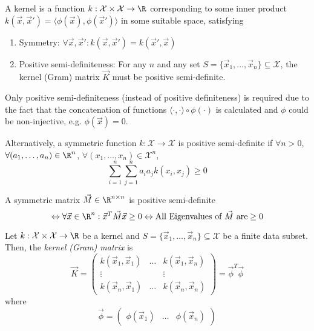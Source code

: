 A kernel is a function
$k : \mathcal{X} \times \mathcal{X} \to \R$
corresponding to some inner product
$k(\vec{x}, \vec{x}') = \langle \phi(\vec{x}), \phi(\vec{x}') \rangle$
in some suitable space,
satisfying
\begin{enumerate}
	\item Symmetry:
	$\forall \vec{x}, \vec{x}': k(\vec{x}, \vec{x}') = k(\vec{x}', \vec{x})$
	\item Positive semi-definiteness:
	For any $n$ and any set $S = \{\vec{x}_1, \dotsc, \vec{x}_n\} \subseteq \mathcal{X}$,
	the kernel (Gram) matrix $\vec{K}$ must be positive
	semi-definite.
\end{enumerate}

Only positive semi-definiteness (instead of positive definiteness)
is required due to the fact that the concatenation of
functions $\langle \cdot, \cdot \rangle \circ \phi(\cdot)$
is calculated and $\phi$ could be non-injective,
e.g. $\phi(\vec{x}) = 0$.

Alternatively, a symmetric function $k : \mathcal{X} \to \mathcal{X}$
is positive semi-definite if
$\forall n > 0$,
$\forall (a_1, \dotsc, a_n) \in \R^n$,
$\forall (x_1, \dotsc, x_n) \in \mathcal{X}^n$,
\begin{equation*}
\sum_{i=1}^n{
	\sum_{j=1}^n{
		a_i a_j k(x_i, x_j)
	}
}
\geq 0
\end{equation*}

A symmetric matrix $\vec{M} \in \R^{n \times n}$
is positive semi-definite
\begin{equation*}
\Leftrightarrow \forall \vec{x} \in \R^n:
\vec{x}^T \vec{M} \vec{x} \geq 0
\Leftrightarrow
\text{All Eigenvalues of $\vec{M}$ are} \geq 0
\end{equation*}

Let $k : \mathcal{X} \times \mathcal{X} \to \R$
be a kernel and $S = \{\vec{x}_1, \dotsc, \vec{x}_n\} \subseteq \mathcal{X}$
be a finite data subset.
Then, the \emph{kernel (Gram) matrix} is
\begin{equation*}
\vec{K} =
\begin{pmatrix}
k(\vec{x}_1, \vec{x}_1) & \dots & k(\vec{x}_1, \vec{x}_n) \\
\vdots & & \vdots \\
k(\vec{x}_n, \vec{x}_1) & \dots & k(\vec{x}_n, \vec{x}_n)
\end{pmatrix}
= \vec{\phi}^T \vec{\phi}
\end{equation*}
where
\begin{equation*}
\vec{\phi} =
\left(
\begin{array}{c|c|c}
\phi(\vec{x}_1) & \dots & \phi(\vec{x}_n)
\end{array}
\right)
\end{equation*}

